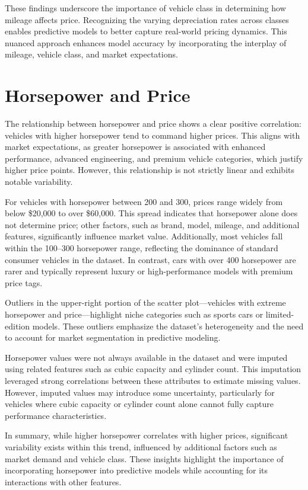 \documentclass[a4paper,oneside,bibliography=totoc]{scrbook}
\begin{document}
These findings underscore the importance of vehicle class in determining how mileage affects price. Recognizing the varying depreciation rates across classes enables predictive models to better capture real-world pricing dynamics. This nuanced approach enhances model accuracy by incorporating the interplay of mileage, vehicle class, and market expectations.

\section{Horsepower and Price}
\label{sec:horsepowerAndPrice}

The relationship between horsepower and price shows a clear positive correlation: vehicles with higher horsepower tend to command higher prices. This aligns with market expectations, as greater horsepower is associated with enhanced performance, advanced engineering, and premium vehicle categories, which justify higher price points. However, this relationship is not strictly linear and exhibits notable variability.

For vehicles with horsepower between 200 and 300, prices range widely from below \$20,000 to over \$60,000. This spread indicates that horsepower alone does not determine price; other factors, such as brand, model, mileage, and additional features, significantly influence market value. Additionally, most vehicles fall within the 100--300 horsepower range, reflecting the dominance of standard consumer vehicles in the dataset. In contrast, cars with over 400 horsepower are rarer and typically represent luxury or high-performance models with premium price tags.

Outliers in the upper-right portion of the scatter plot---vehicles with extreme horsepower and price---highlight niche categories such as sports cars or limited-edition models. These outliers emphasize the dataset's heterogeneity and the need to account for market segmentation in predictive modeling.

Horsepower values were not always available in the dataset and were imputed using related features such as cubic capacity and cylinder count. This imputation leveraged strong correlations between these attributes to estimate missing values. However, imputed values may introduce some uncertainty, particularly for vehicles where cubic capacity or cylinder count alone cannot fully capture performance characteristics.

In summary, while higher horsepower correlates with higher prices, significant variability exists within this trend, influenced by additional factors such as market demand and vehicle class. These insights highlight the importance of incorporating horsepower into predictive models while accounting for its interactions with other features.
\end{document}
